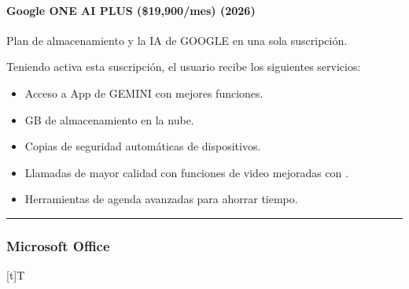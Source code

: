 \documentclass[letterpaper,10pt,spanish]{sphinxmanual}
\let\sphinxpxdimen\pdfpxdimen\else\newdimen\sphinxpxdimen
\begin{document}
\paragraph{Google ONE \sphinxhyphen{} AI PLUS (\$19,900/mes) (2026)}
\label{\detokenize{1_guias/10ofimatica/G1011:google-one-ai-plus-19-900-mes-2026}}
\sphinxAtStartPar
\sphinxfootnotemark[2] Plan de almacenamiento y la IA de GOOGLE en una sola suscripción.

\sphinxAtStartPar
Teniendo activa esta suscripción, el usuario recibe los siguientes servicios:
\begin{itemize}
\item {} 
\sphinxAtStartPar
Acceso a App de GEMINI con mejores funciones.

\item {} 
 GB de almacenamiento en la nube.

\item {} 
\sphinxAtStartPar
Copias de seguridad automáticas de dispositivos.

\item {} 
\sphinxAtStartPar
Llamadas de mayor calidad con funciones de video mejoradas con .

\item {} 
\sphinxAtStartPar
Herramientas de agenda avanzadas para ahorrar tiempo.

\end{itemize}


\bigskip\hrule\bigskip



\subsubsection{Microsoft Office}
\label{\detokenize{1_guias/10ofimatica/G1011:microsoft-office}}

\begin{savenotes}\sphinxattablestart
\sphinxthistablewithglobalstyle
\centering
\begin{tabulary}{\linewidth}[t]{T}
\sphinxtoprule
\sphinxtableatstartofbodyhook

\begin{sphinxfigure-in-table}
\centering
\capstart
\noindent\sphinxincludegraphics[width=450\sphinxpxdimen]{{image023}.png}
\label{\detokenize{1_guias/10ofimatica/G1011:id10}}\end{sphinxfigure-in-table}\relax
\\
\sphinxbottomrule
\end{tabulary}
\sphinxtableafterendhook\par
\sphinxattableend\end{savenotes}
\end{document}
